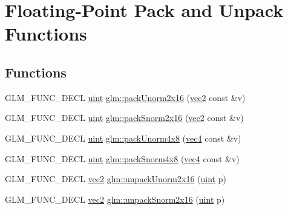 \hypertarget{group__core__func__packing}{}\section{Floating-\/\+Point Pack and Unpack Functions}
\label{group__core__func__packing}
\subsection*{Functions}
\begin{DoxyCompactItemize}
\item 
G\+L\+M\+\_\+\+F\+U\+N\+C\+\_\+\+D\+E\+CL \hyperlink{group__core__precision_ga4fd29415871152bfb5abd588334147c8}{uint} \hyperlink{group__core__func__packing_ga0659ddaf09727551c7bf51655d2a65cf}{glm\+::pack\+Unorm2x16} (\hyperlink{group__core__types_gaa1618f51db67eaa145db101d8c8431d8}{vec2} const \&v)
\item 
G\+L\+M\+\_\+\+F\+U\+N\+C\+\_\+\+D\+E\+CL \hyperlink{group__core__precision_ga4fd29415871152bfb5abd588334147c8}{uint} \hyperlink{group__core__func__packing_ga0c8005de240d6c4ca3d16c7bee25c622}{glm\+::pack\+Snorm2x16} (\hyperlink{group__core__types_gaa1618f51db67eaa145db101d8c8431d8}{vec2} const \&v)
\item 
G\+L\+M\+\_\+\+F\+U\+N\+C\+\_\+\+D\+E\+CL \hyperlink{group__core__precision_ga4fd29415871152bfb5abd588334147c8}{uint} \hyperlink{group__core__func__packing_ga834ee9a9e73dcb0a7c1fc88143f3edb8}{glm\+::pack\+Unorm4x8} (\hyperlink{group__core__types_ga5881b1b022d7fd1b7218f5916532dd02}{vec4} const \&v)
\item 
G\+L\+M\+\_\+\+F\+U\+N\+C\+\_\+\+D\+E\+CL \hyperlink{group__core__precision_ga4fd29415871152bfb5abd588334147c8}{uint} \hyperlink{group__core__func__packing_gafcf25acc0d361c6c696a433aa5dfd16b}{glm\+::pack\+Snorm4x8} (\hyperlink{group__core__types_ga5881b1b022d7fd1b7218f5916532dd02}{vec4} const \&v)
\item 
G\+L\+M\+\_\+\+F\+U\+N\+C\+\_\+\+D\+E\+CL \hyperlink{group__core__types_gaa1618f51db67eaa145db101d8c8431d8}{vec2} \hyperlink{group__core__func__packing_ga11776a74e1885a14e1295d6e917a9ae2}{glm\+::unpack\+Unorm2x16} (\hyperlink{group__core__precision_ga4fd29415871152bfb5abd588334147c8}{uint} p)
\item 
G\+L\+M\+\_\+\+F\+U\+N\+C\+\_\+\+D\+E\+CL \hyperlink{group__core__types_gaa1618f51db67eaa145db101d8c8431d8}{vec2} \hyperlink{group__core__func__packing_gae5f30f599243df9525315edecae09a7f}{glm\+::unpack\+Snorm2x16} (\hyperlink{group__core__precision_ga4fd29415871152bfb5abd588334147c8}{uint} p)

\end{DoxyCompactItemize}
